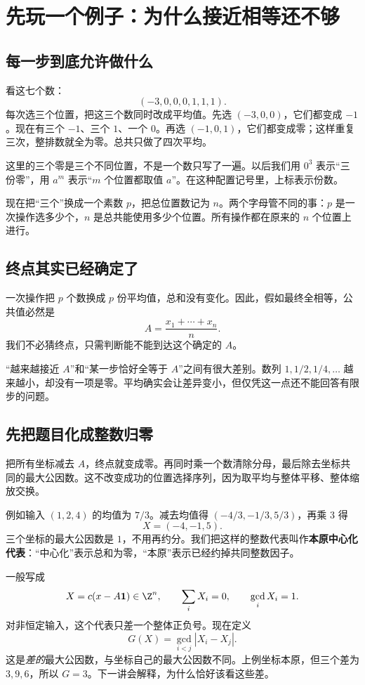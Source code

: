 \chapter{先玩一个例子：为什么接近相等还不够}\label{sec:main}
\section{每一步到底允许做什么}
看这七个数：
\[(-3,0,0,0,1,1,1).
\]
每次选三个位置，把这三个数同时改成平均值。先选 $(-3,0,0)$，它们都变成 $-1$。现在有三个 $-1$、三个 $1$、一个 $0$。再选 $(-1,0,1)$，它们都变成零；这样重复三次，整排数就全为零。总共只做了四次平均。

这里的三个零是三个不同位置，不是一个数只写了一遍。以后我们用 $0^3$ 表示“三份零”，用 $a^m$ 表示“$m$ 个位置都取值 $a$”。在这种配置记号里，上标表示份数。

现在把“三个”换成一个素数 $p$，把总位置数记为 $n$。两个字母管不同的事：$p$ 是一次操作选多少个，$n$ 是总共能使用多少个位置。所有操作都在原来的 $n$ 个位置上进行。

\section{终点其实已经确定了}
一次操作把 $p$ 个数换成 $p$ 份平均值，总和没有变化。因此，假如最终全相等，公共值必然是
\[A=\frac{x_1+\cdots+x_n}{n}.
\]
我们不必猜终点，只需判断能不能到达这个确定的 $A$。

“越来越接近 $A$”和“某一步恰好全等于 $A$”之间有很大差别。数列 $1,1/2,1/4,\ldots$ 越来越小，却没有一项是零。平均确实会让差异变小，但仅凭这一点还不能回答有限步的问题。

\section{先把题目化成整数归零}
把所有坐标减去 $A$，终点就变成零。再同时乘一个数清除分母，最后除去坐标共同的最大公因数。这不改变成功的位置选择序列，因为取平均与整体平移、整体缩放交换。

例如输入 $(1,2,4)$ 的均值为 $7/3$。减去均值得 $(-4/3,-1/3,5/3)$，再乘 $3$ 得
\[X=(-4,-1,5).
\]
三个坐标的最大公因数是 $1$，不用再约分。我们把这样的整数代表叫作\textbf{本原中心化代表}：“中心化”表示总和为零，“本原”表示已经约掉共同整数因子。

一般写成
\[X=c(x-A\mathbf1)\in\Z^n,\qquad \sum_iX_i=0,\qquad\gcd_iX_i=1.
\]
对非恒定输入，这个代表只差一个整体正负号。现在定义
\begin{equation}\label{eq:G}
G(X)=\gcd_{i<j}|X_i-X_j|.
\end{equation}
这是\emph{差的}最大公因数，与坐标自己的最大公因数不同。上例坐标本原，但三个差为 $3,9,6$，所以 $G=3$。下一讲会解释，为什么恰好该看这些差。

